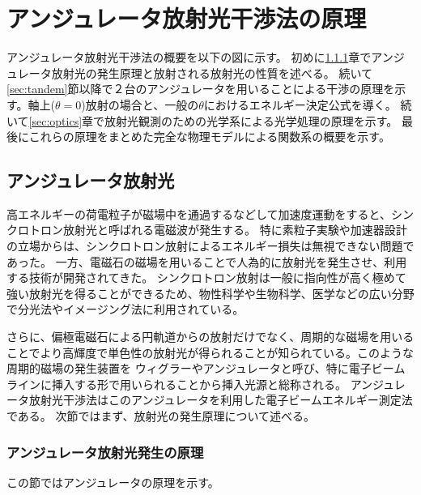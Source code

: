 \documentclass[a4paper,11pt,uplatex]{jsbook}
\begin{document}
\chapter{アンジュレータ放射光干渉法の原理}
アンジュレータ放射光干渉法の概要を以下の図に示す。
初めに\ref{sec:undulator}章でアンジュレータ放射光の発生原理と放射される放射光の性質を述べる。
続いて\ref{sec:tandem}節以降で２台のアンジュレータを用いることによる干渉の原理を示す。軸上($\theta =0$)放射の場合と、一般の$\theta$におけるエネルギー決定公式を導く。
続いて\ref{sec:optics}章で放射光観測のための光学系による光学処理の原理を示す。
最後にこれらの原理をまとめた完全な物理モデルによる関数系の概要を示す。
\section{アンジュレータ放射光}
高エネルギーの荷電粒子が磁場中を通過するなどして加速度運動をすると、シンクロトロン放射光と呼ばれる電磁波が発生する。
特に素粒子実験や加速器設計の立場からは、シンクロトロン放射によるエネルギー損失は無視できない問題であった。
一方、電磁石の磁場を用いることで人為的に放射光を発生させ、利用する技術が開発されてきた。
シンクロトロン放射は一般に指向性が高く極めて強い放射光を得ることができるため、物性科学や生物科学、医学などの広い分野で分光法やイメージング法に利用されている。

さらに、偏極電磁石による円軌道からの放射だけでなく、周期的な磁場を用いることでより高輝度で単色性の放射光が得られることが知られている。このような周期的磁場の発生装置を
ウィグラーやアンジュレータと呼び、特に電子ビームラインに挿入する形で用いられることから挿入光源と総称される。
アンジュレータ放射光干渉法はこのアンジュレータを利用した電子ビームエネルギー測定法である。
次節ではまず、放射光の発生原理について述べる。

\subsection{アンジュレータ放射光発生の原理}\label{sec:undulator}
この節ではアンジュレータの原理を示す。
\end{document}
